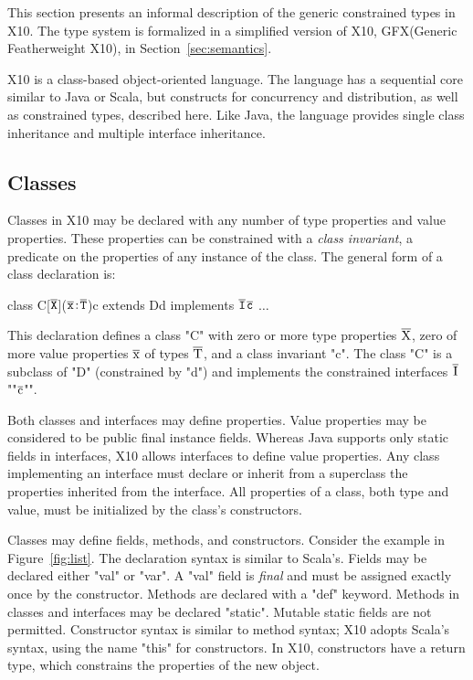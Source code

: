 \documentclass[preprint,nocopyrightspace,9pt]{sigplanconf}
\newcommand\gxx{GFX\xspace}
\newcommand\xbar[1]{\ensuremath{\bar{\Xcd{#1}}}}
\newcommand\tbar[1]{\ensuremath{\bar{\tt {#1}}}}
\begin{document}
This section presents an informal description of the 
generic constrained types in X10.  The type system is formalized
in a simplified version of X10, \gxx (Generic Featherweight X10), in
Section~\ref{sec:semantics}.

X10 is a class-based object-oriented language.
The language has a sequential core similar to Java or Scala, but 
constructs
for concurrency and distribution, as well as constrained types,
described here.
Like Java, the language provides single class inheritance and
multiple interface inheritance.

\subsection{Classes}

Classes in X10 may be declared with any number of type properties and
value properties.  These properties can be constrained with a
\emph{class invariant},
a predicate on the properties of any instance of the class.
%
The general form of a class declaration is:
\begin{xtenmath}
class C[$\tbar{X}$]($\tbar{x} \ty \tbar{T}$){c} extends D{d}
      implements $\tbar{I}${$\tbar{c}$} { $\dots$ }
\end{xtenmath}
This declaration defines a class \xcd"C" with zero or more type properties
          \xbar{X}, zero of more value properties \xbar{x} of
          types \xbar{T}, and a class invariant \xcd"c".
          The class \xcd"C" is a subclass of \xcd"D"
          (constrained by \xcd"d")
          and implements the constrained
          interfaces \xbar{I}\xcd"{"\xbar{c}\xcd"}".

Both classes and interfaces may define properties. Value
properties may be considered to be public final instance fields.
Whereas
Java supports only static fields in interfaces, X10
allows interfaces to define value properties. Any class implementing
an interface must declare or inherit from a superclass 
the properties inherited from the interface.  All properties of
a class,
both type and value, must be initialized by the class's
constructors.

Classes may define fields, methods, and constructors.
Consider the example in Figure~\ref{fig:list}.
The
declaration syntax
is similar to Scala's.  Fields may be
declared either \xcd"val" or \xcd"var".  A \xcd"val" field is
\emph{final} and must be assigned exactly once by the
constructor.  Methods are
declared with a \xcd"def" keyword.
Methods in classes and interfaces may be declared \xcd"static".
Mutable static fields 
are not permitted.
Constructor syntax is
similar to method syntax; X10 adopts Scala's syntax,
using the name \xcd"this" for constructors.
In X10, constructors have a return type, which constrains
the properties of the new object.
\end{document}
